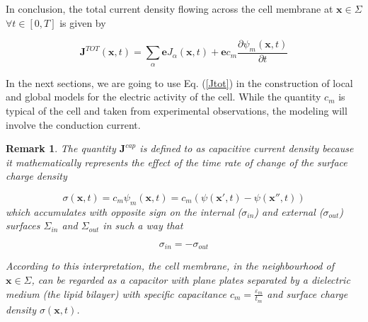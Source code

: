 \documentclass[12pt, a4paper]{report}
\newtheorem{remark}{Remark}
\begin{document}
In conclusion, the total current density flowing across the cell membrane at $ \textbf{x} \in \Sigma$ $\forall t \in [0,T]$ is given by

\begin{equation}
\textbf{J}^{TOT}(\textbf{x},t) = \sum_{\alpha} \textbf{e} J_{\alpha}(\textbf{x},t) + \textbf{e} c_m \frac{\partial \psi_m (\textbf{x},t)}{\partial t} \label{Jtot}
\end{equation}

In the next sections, we are going to use Eq. (\ref{Jtot}) in the construction of local and global models for the electric activity of the cell. While the quantity $c_m$ is typical of the cell and taken from experimental observations, the modeling will involve the conduction current. 

\begin{remark}
	The quantity $\textbf{J}^{cap}$ is defined to as capacitive current density because it mathematically represents the effect of the time rate of change of the surface charge density 
	
	$$ \sigma(\textbf{x},t) = c_m \psi_m (\textbf{x},t) = c_m \left(\psi(\textbf{x}',t) - \psi(\textbf{x}'',t) \right)$$
	which accumulates with opposite sign on the internal ($\sigma_{in}$) and external ($\sigma_{out}$) surfaces $\Sigma_{in}$ and $\Sigma_{out}$ in such a way that
	
	$$ \sigma_{in} = -\sigma_{out} $$
	
	According to this interpretation, the cell membrane, in the neighbourhood of $ \textbf{x} \in \Sigma$, can be regarded as a capacitor with plane plates separated by a dielectric medium (the lipid bilayer) with specific capacitance $ c_m = \frac{\varepsilon_m}{t_m}$ and surface charge density $\sigma(\textbf{x},t)$.
\end{remark}
\end{document}
